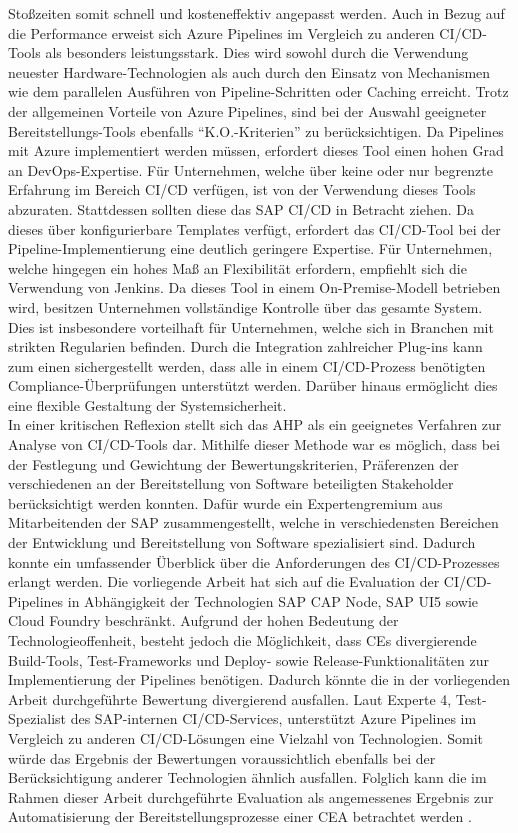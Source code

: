 Stoßzeiten somit schnell und kosteneffektiv angepasst werden. Auch in Bezug auf die Performance erweist sich Azure Pipelines im Vergleich zu anderen CI/CD-Tools als besonders leistungsstark. Dies wird sowohl durch die Verwendung neuester Hardware-Technologien als auch durch den Einsatz von Mechanismen wie dem parallelen Ausführen von Pipeline-Schritten oder Caching erreicht.  Trotz der allgemeinen Vorteile von Azure Pipelines, sind bei der Auswahl geeigneter Bereitstellungs-Tools ebenfalls \enquote{K.O.-Kriterien} zu berücksichtigen. Da Pipelines mit Azure implementiert werden müssen, erfordert dieses Tool einen hohen Grad an DevOps-Expertise. Für Unternehmen, welche über keine oder nur begrenzte Erfahrung im Bereich CI/CD verfügen, ist von der Verwendung dieses Tools abzuraten. Stattdessen sollten diese das SAP CI/CD in Betracht ziehen. Da dieses über konfigurierbare Templates verfügt, erfordert das CI/CD-Tool bei der Pipeline-Implementierung eine deutlich geringere Expertise. Für Unternehmen, welche hingegen ein hohes Maß an Flexibilität erfordern, empfiehlt sich die Verwendung von Jenkins. Da dieses Tool in einem On-Premise-Modell betrieben wird, besitzen Unternehmen vollständige Kontrolle über das gesamte System. Dies ist insbesondere vorteilhaft für Unternehmen, welche sich in Branchen mit strikten Regularien befinden. Durch die Integration zahlreicher Plug-ins kann zum einen sichergestellt werden, dass alle in einem CI/CD-Prozess benötigten Compliance-Überprüfungen unterstützt werden. Darüber hinaus ermöglicht dies eine flexible Gestaltung der Systemsicherheit.\\ In einer kritischen Reflexion stellt sich das AHP als ein geeignetes Verfahren zur Analyse von CI/CD-Tools dar. Mithilfe dieser Methode war es möglich, dass bei der Festlegung und Gewichtung der Bewertungskriterien, Präferenzen der verschiedenen an der Bereitstellung von Software beteiligten Stakeholder berücksichtigt werden konnten. Dafür wurde ein Expertengremium aus Mitarbeitenden der SAP zusammengestellt, welche in verschiedensten Bereichen der Entwicklung und Bereitstellung von Software spezialisiert sind. Dadurch konnte ein umfassender Überblick über die Anforderungen des CI/CD-Prozesses erlangt werden. Die vorliegende Arbeit hat sich auf die Evaluation der CI/CD-Pipelines in Abhängigkeit der Technologien SAP CAP Node, SAP UI5 sowie Cloud Foundry beschränkt. Aufgrund der hohen Bedeutung der Technologieoffenheit, besteht jedoch die Möglichkeit, dass CEs divergierende Build-Tools, Test-Frameworks und Deploy- sowie Release-Funktionalitäten zur Implementierung der Pipelines benötigen. Dadurch könnte die in der vorliegenden Arbeit durchgeführte Bewertung divergierend ausfallen. Laut Experte 4, Test-Spezialist des SAP-internen CI/CD-Services, unterstützt Azure Pipelines im Vergleich zu anderen CI/CD-Lösungen eine Vielzahl von Technologien. Somit würde das Ergebnis der Bewertungen voraussichtlich ebenfalls bei der Berücksichtigung anderer Technologien ähnlich ausfallen. Folglich kann die im Rahmen dieser Arbeit durchgeführte Evaluation als angemessenes Ergebnis zur Automatisierung der Bereitstellungsprozesse einer CEA betrachtet werden \cite[Z. 59 ff.]{TestDeveloperSAPHyperspaceAdoption&Onboarding.}.

